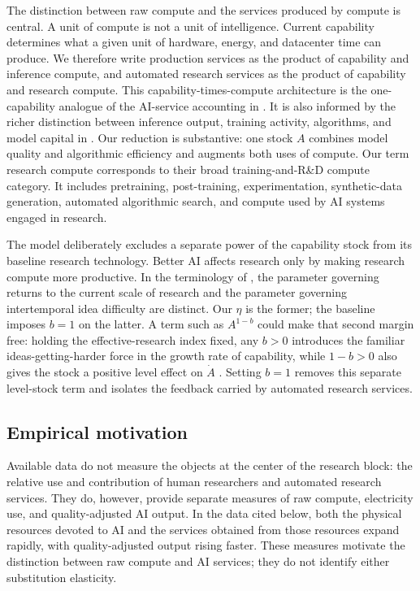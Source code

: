The distinction between raw compute and the services produced by compute is
central. A unit of compute is not a unit of intelligence. Current capability
determines what a given unit of hardware, energy, and datacenter time can produce.
We therefore write production services as the product of capability and inference
compute, and automated research services as the product of capability and research
compute. This capability-times-compute architecture is the one-capability analogue
of the AI-service accounting in \citet{davidsonetal2026}. It is also informed by
the richer distinction between inference output, training activity, algorithms,
and model capital in \citet{korinekmckelvey2026}. Our reduction is substantive:
one stock \(A\) combines model quality and algorithmic efficiency and augments
both uses of compute. Our term research compute corresponds to their broad
training-and-R\&D compute category. It includes pretraining, post-training,
experimentation, synthetic-data generation, automated algorithmic search, and
compute used by AI systems engaged in research.

The model deliberately excludes a separate power of the capability stock from its
baseline research technology. Better AI affects research only by making research
compute more productive. In the terminology of \citet{davidsonetal2026}, the
parameter governing returns to the current scale of research and the parameter
governing intertemporal idea difficulty are distinct. Our \(\eta\) is the former;
the baseline imposes \(b=1\) on the latter. A term such as \(A^{1-b}\) could make
that second margin free: holding the effective-research index fixed, any \(b>0\)
introduces the familiar ideas-getting-harder force in the growth rate of capability,
while \(1-b>0\) also gives the stock a positive level effect on \(\dot A\)
\citep{jones1995,davidsonetal2026}. Setting \(b=1\) removes this separate
level-stock term and isolates the feedback carried by automated research services.

\subsection{Empirical motivation}

Available data do not measure the objects at the center of the research block:
the relative use and contribution of human researchers and automated research
services. They do, however, provide
separate measures of raw compute, electricity use, and quality-adjusted AI output.
In the data cited below, both the physical resources devoted to AI and the
services obtained from those resources expand rapidly, with quality-adjusted
output rising faster. These measures motivate the distinction between raw compute
and AI services; they do not identify either substitution elasticity.

